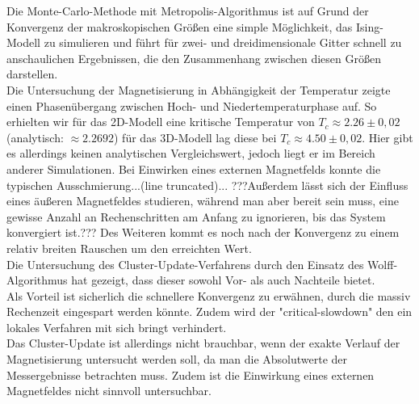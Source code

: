 
Die Monte-Carlo-Methode mit Metropolis-Algorithmus ist auf Grund der Konvergenz der makroskopischen Größen eine simple Möglichkeit, das Ising-Modell zu simulieren und führt für zwei- und dreidimensionale Gitter schnell zu anschaulichen Ergebnissen, die den Zusammenhang zwischen diesen Größen darstellen.\\
Die Untersuchung der Magnetisierung in Abhängigkeit der Temperatur zeigte einen Phasenübergang zwischen Hoch- und Niedertemperaturphase auf. So erhielten wir für das 2D-Modell eine kritische Temperatur von $ T_c \approx 2.26 \pm 0,02$ (analytisch: $\approx 2.2692$) für das 3D-Modell lag diese bei $ T_c \approx 4.50 \pm 0,02$. Hier gibt es allerdings keinen analytischen Vergleichswert, jedoch liegt er im Bereich anderer Simulationen. Bei Einwirken eines externen Magnetfelds konnte die typischen Ausschmierung...(line truncated)...
???Außerdem lässt sich der Einfluss eines äußeren Magnetfeldes studieren, während man aber bereit sein muss, eine gewisse Anzahl an Rechenschritten am Anfang zu ignorieren, bis das System konvergiert ist.??? Des Weiteren kommt es noch nach der Konvergenz zu einem relativ breiten Rauschen um den erreichten Wert.\\
Die Untersuchung des Cluster-Update-Verfahrens durch den Einsatz des Wolff-Algorithmus hat gezeigt, dass dieser sowohl Vor- als auch Nachteile bietet.\\
Als Vorteil ist sicherlich die schnellere Konvergenz zu erwähnen, durch die massiv Rechenzeit eingespart werden könnte. Zudem wird der "critical-slowdown" den ein lokales Verfahren mit sich bringt verhindert.\\
Das Cluster-Update ist allerdings nicht brauchbar, wenn der exakte Verlauf der Magnetisierung untersucht werden soll, da man die Absolutwerte der Messergebnisse betrachten muss. Zudem ist die Einwirkung eines externen Magnetfeldes nicht sinnvoll untersuchbar.
 
